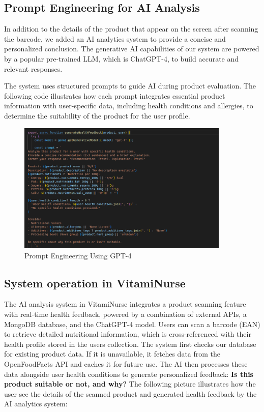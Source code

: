 \subsection{Prompt Engineering for AI Analysis}
\par In addition to the details of the product that appear on the screen after scanning the barcode, we added an AI analytics system to provide a concise and personalized conclusion.
 The generative AI capabilities of our system are powered by a popular pre-trained LLM, which is ChatGPT-4, to build accurate and relevant responses.
 \par The system uses structured prompts to guide AI during product evaluation.
The following code illustrates how each prompt integrates essential product information with user-specific data, including health conditions and allergies, to determine the suitability of the product for the user profile.
 \begin{center}
    \begin{figure}[H]
    \includegraphics[width=0.9\textwidth]{images/prompt_engineering.png}
    \caption{Prompt Engineering Using GPT-4} 
    \label{fig:Prompt Engineering}
\end{figure}
\end{center}

\subsection{System operation in VitamiNurse}
The AI analysis system in VitamiNurse integrates a product scanning feature with real-time health feedback, powered by a combination of external APIs, a MongoDB database, and the ChatGPT-4 model. Users can scan a barcode (EAN) to retrieve detailed nutritional information, which is cross-referenced with their health profile stored in the users collection. The system first checks our database for existing product data. If it is unavailable, it fetches data from the OpenFoodFacts API and caches it for future use. The AI then processes these data alongside user health conditions to generate personalized feedback: \textbf{Is this product suitable or not, and why?}
The following picture illustrates how the user see the details of the scanned product and generated health feedback by the AI analytics system:

